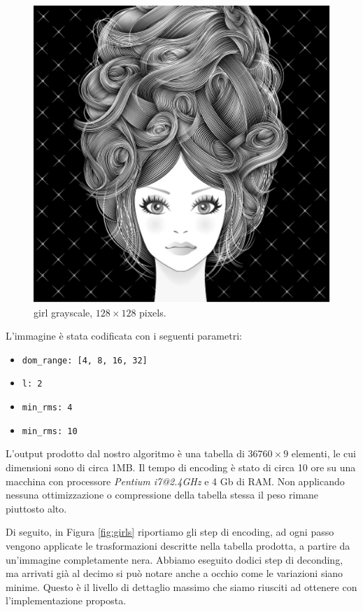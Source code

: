 \documentclass[11pt,a4paper,appendixprefix=true,numbers=noenddot]{scrreprt}
\begin{document}
\begin{figure}[ht]
\centering
\includegraphics[scale=0.4]{images/girl.pdf} 
\caption{girl grayscale, $128 \times 128$ pixels.}
\label{fig:girl}
\end{figure}

L'immagine è stata codificata con i seguenti parametri:
\begin{itemize}
\item \texttt{dom\_range: [4, 8, 16, 32]} 
\item \texttt{l: 2}
\item \texttt{min\_rms: 4}
\item \texttt{min\_rms: 10}
\end{itemize}

L'output prodotto dal nostro algoritmo è una tabella di $36760 \times 9$ elementi, le cui dimensioni sono di circa 1MB. Il tempo di encoding è stato di circa 10 ore su una macchina con processore \textit{Pentium i7@2.4GHz} e 4 Gb di RAM. Non applicando nessuna ottimizzazione o compressione della tabella stessa il peso rimane piuttosto alto. 

Di seguito, in Figura \ref{fig:girls} riportiamo gli step di encoding, ad ogni passo vengono applicate le trasformazioni descritte nella tabella prodotta, a partire da un'immagine completamente nera. Abbiamo eseguito dodici step di deconding, ma arrivati già al decimo si può notare anche a occhio come le variazioni siano minime. Questo è il livello di dettaglio massimo che siamo riusciti ad ottenere con l'implementazione proposta.
\end{document}
